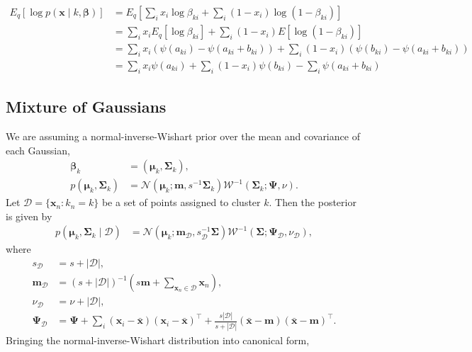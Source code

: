 \documentclass[a4paper]{article}
\begin{document}
			\begin{align}
				E_q\left[ \log p(\mathbf{x} \mid k, \bm{\beta}) \right]
				&= E_q\left[ \sum_i x_i \log \beta_{ki} + \sum_i (1 - x_i) \log (1 - \beta_{ki}) \right] \\
				&= \sum_i x_i E_q\left[ \log \beta_{ki} \right] + \sum_i (1 - x_i) E\left[ \log (1 - \beta_{ki})  \right] \\
				&= \sum_i x_i \left( \psi(a_{ki}) - \psi(a_{ki} + b_{ki}) \right) + \sum_i (1 - x_i) \left( \psi(b_{ki}) - \psi(a_{ki} + b_{ki}) \right) \\
				&= \sum_i x_i \psi(a_{ki}) + \sum_i (1 - x_i) \psi(b_{ki}) - \sum_i \psi(a_{ki} + b_{ki})
			\end{align}

		\subsection*{Mixture of Gaussians}
			We are assuming a normal-inverse-Wishart prior over the mean and covariance of each Gaussian,
			\begin{align}
				\bm{\beta}_k &= (\bm{\mu}_k, \bm{\Sigma}_k), \\
				p(\bm{\mu}_k, \bm{\Sigma}_k) &= \mathcal{N}(\bm{\mu}_k; \mathbf{m}, s^{-1}\bm{\Sigma}_k) \mathcal{W}^{-1}(\bm{\Sigma}_k; \bm{\Psi}, \nu).
			\end{align}
			Let $\mathcal{D} = \{ \mathbf{x}_n : k_n = k \}$ be a set of points assigned to cluster $k$. Then the posterior is given by
			\begin{align}
				p(\bm{\mu}_k, \bm{\Sigma}_k \mid \mathcal{D}) &= \mathcal{N}(\bm{\mu}_k; \mathbf{m}_\mathcal{D}, s_\mathcal{D}^{-1}\bm{\Sigma}) \mathcal{W}^{-1}(\bm{\Sigma}; \bm{\Psi}_\mathcal{D}, \nu_\mathcal{D}),
			\end{align}
			where
			\begin{align}
				s_\mathcal{D} &= s + |\mathcal{D}|, \\
				\mathbf{m}_\mathcal{D} &= (s + |\mathcal{D}|)^{-1} \left(s\mathbf{m} + \sum_{ \mathbf{x}_n \in \mathcal{D}} \mathbf{x}_n \right), \\
				\nu_\mathcal{D} &= \nu + |\mathcal{D}|, \\
				\bm{\Psi}_\mathcal{D} &= \bm{\Psi} + \sum_i (\mathbf{x}_i - \mathbf{\bar x})(\mathbf{x}_i - \mathbf{\bar x})^\top
				+ \frac{s|\mathcal{D}|}{s + |\mathcal{D}|} (\mathbf{\bar x} - \mathbf{m}) (\mathbf{\bar x} - \mathbf{m})^\top.
			\end{align}
			Bringing the normal-inverse-Wishart distribution into canonical form,
\end{document}
